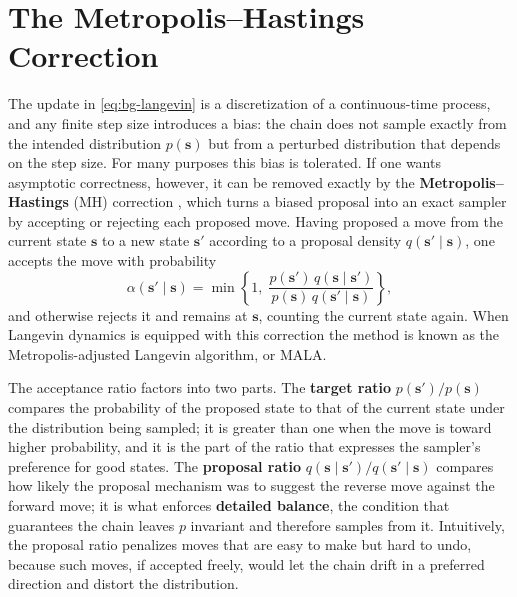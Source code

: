 \section{The Metropolis--Hastings Correction}
\label{sec:bg-mh}

The update in \eqref{eq:bg-langevin} is a discretization of a continuous-time process, and any finite step size introduces a bias: the chain does not sample exactly from the intended distribution $p(\bm{s})$ but from a perturbed distribution that depends on the step size. For many purposes this bias is tolerated. If one wants asymptotic correctness, however, it can be removed exactly by the \textbf{Metropolis--Hastings} (MH) correction \citep{metropolis1953equation, hastings1970monte}, which turns a biased proposal into an exact sampler by accepting or rejecting each proposed move. Having proposed a move from the current state $\bm{s}$ to a new state $\bm{s}'$ according to a proposal density $q(\bm{s}' \mid \bm{s})$, one accepts the move with probability
\begin{equation}
    \alpha(\bm{s}' \mid \bm{s}) = \min\left\{ 1,\; \frac{p(\bm{s}')\, q(\bm{s} \mid \bm{s}')}{p(\bm{s})\, q(\bm{s}' \mid \bm{s})} \right\},
    \label{eq:bg-mh}
\end{equation}
and otherwise rejects it and remains at $\bm{s}$, counting the current state again. When Langevin dynamics is equipped with this correction the method is known as the Metropolis-adjusted Langevin algorithm, or MALA.

The acceptance ratio factors into two parts. The \textbf{target ratio} $p(\bm{s}')/p(\bm{s})$ compares the probability of the proposed state to that of the current state under the distribution being sampled; it is greater than one when the move is toward higher probability, and it is the part of the ratio that expresses the sampler's preference for good states. The \textbf{proposal ratio} $q(\bm{s} \mid \bm{s}')/q(\bm{s}' \mid \bm{s})$ compares how likely the proposal mechanism was to suggest the reverse move against the forward move; it is what enforces \textbf{detailed balance}, the condition that guarantees the chain leaves $p$ invariant and therefore samples from it. Intuitively, the proposal ratio penalizes moves that are easy to make but hard to undo, because such moves, if accepted freely, would let the chain drift in a preferred direction and distort the distribution.


